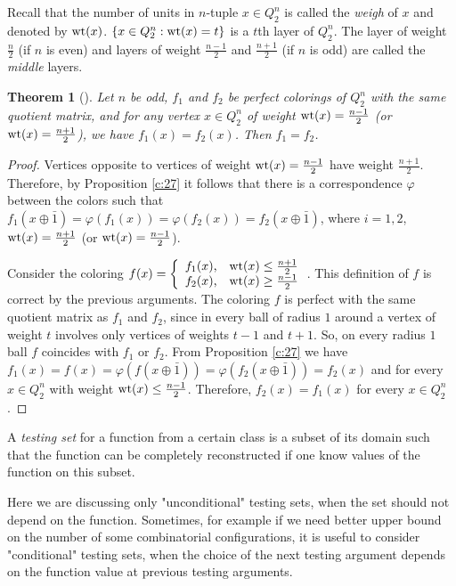 \documentclass[11pt]{article}
\newtheorem{theorem}{Theorem}[section]
\theoremstyle{definition}
\newcommand{\wt}{{\rm wt}}
\begin{document}
{{Recall that the number of units in $n$-tuple $x\in Q^n_2$ is called the {\sl weigh} of $x$ and denoted by $\wt(x)$. $\{x\in  Q^n_2 : \wt(x)=t\}$ is a $t$th layer of  $Q^n_2$.  The  layer of weight $\frac{n}{2}$ (if $n$ is even) and  
layers of weight $\frac{n-1}{2}$ and  $\frac{n+1}{2}$ (if $n$ is odd) are called the {\sl middle} layers.

\begin{theorem}[\cite{Avgust}]\label{thAvg}
Let $n$ be odd, $f_1$ and $f_2$ be perfect colorings
of $Q^n_2$ with the same quotient matrix, and for any
vertex $x\in Q^n_2$ of weight $\wt(x)=\frac{n-1}{2}$ (or
$\wt(x)=\frac{n+1}{2}$), we have $f_1(x)=f_2(x)$. Then $f_1=
f_2$.
\end{theorem}
\begin{proof}
Vertices opposite to vertices of weight $\wt(x)=\frac{n-1}{2}$ have
weight $\frac{n+1}{2}$. Therefore, by Proposition \ref{c:27} it follows that
there is a correspondence $\varphi$ between the colors such that $f_1(x\oplus
\bar{1})=\varphi(f_1(x))=\varphi(f_2(x))=f_2(x\oplus \bar{1})$, where
$i=1,2$, $\wt(x)=\frac{n+1}{2}$ (or $\wt(x)=\frac{n-1}{2}$).


Consider the coloring $f(x)=\left\{
\begin{array}{ll}
f_1(x)\mbox{,} & \wt(x)\le\frac{n+1}{2}\\
f_2(x)\mbox{,} & \wt(x)\geq \frac{n-1}{2}
\end{array}
\right. $. This definition of $f$ is correct by the previous arguments. The coloring $f$ is perfect with the same quotient matrix
as $f_1$ and $f_2$, since in every ball of radius $1$ around a vertex of weight $t$ involves only vertices of weights $t-1$ and $t+1$. So, on every  radius $1$ ball $f$  coincides with
$f_1$ or $f_2$. From Proposition \ref{c:27} we have
$f_1(x)=f(x)=\varphi(f(x\oplus \bar{1}))=\varphi(f_2(x\oplus
\bar{1}))=f_2(x)$ and for every $x\in Q^n_2$ with weight $\wt(x)\le\frac{n-1}{2}$. Therefore,
$f_2(x)=f_1(x)$ for every $x\in Q^n_2$.
\end{proof}

A {\sl testing set} for a function from a certain class is a
subset of its domain such that the function can be completely reconstructed if one know values of the function on this subset.

Here we are discussing only "unconditional" testing sets, when
the  set should not depend on the function. Sometimes, for example if we need better upper bound on the number of some combinatorial configurations, it is useful
to consider "conditional" testing sets, when the choice of the next
testing argument depends on the function value at previous testing
arguments.

}}
\end{document}
